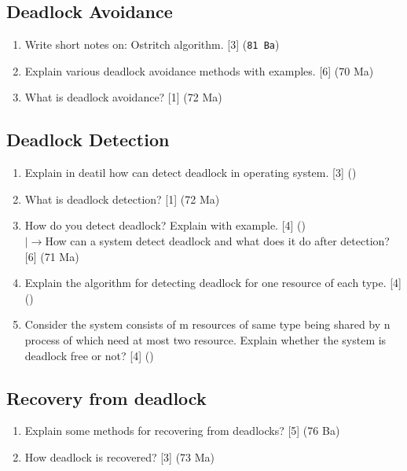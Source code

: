 \documentclass[12pt]{article}
\newcommand{\lb}{\\$\left|\rightarrow\right.$}
\begin{document}
	\subsection{Deadlock Avoidance}
		\begin{enumerate}
			\item Write short notes on: Ostritch algorithm. \hfill [3] (\texttt{81 Ba})

			\item Explain various deadlock avoidance methods with examples. \hfill [6] (70 Ma)

			\item What is deadlock avoidance? \hfill [1] (72 Ma)
		\end{enumerate}

	\subsection{Deadlock Detection}
		\begin{enumerate}
			\item Explain in deatil how can detect deadlock in operating system. \hfill [3] ()

			\item What is deadlock detection? \hfill [1] (72 Ma)

			\item How do you detect deadlock? Explain with example. \hfill [4] ()
			\lb How can a system detect deadlock and what does it do after detection? \hfill [6] (71 Ma)

			\item Explain the algorithm for detecting deadlock for one resource of each type. \hfill [4] ()

			\item Consider the system consists of m resources of same type being shared by n process of which need at most two resource. Explain whether the system is deadlock free or not? \hfill [4] ()
		\end{enumerate}

	\subsection{Recovery from deadlock}
		\begin{enumerate}
			\item Explain some methods for recovering from deadlocks? \hfill [5] (76 Ba)

			\item How deadlock is recovered? \hfill [3] (73 Ma)
		\end{enumerate}
\end{document}
